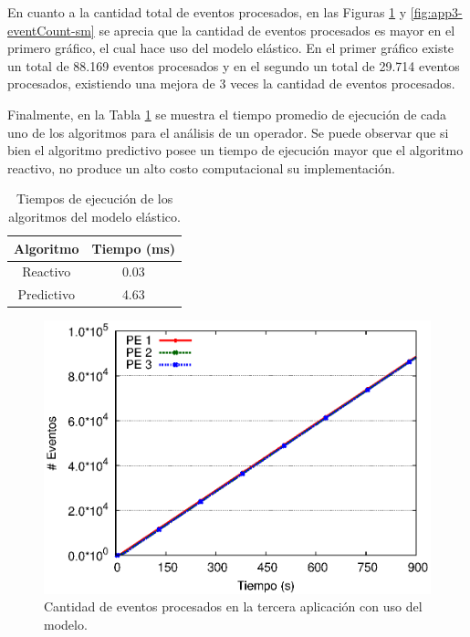En cuanto a la cantidad total de eventos procesados, en las Figuras \ref{fig:app3-eventCount-cm} y \ref{fig:app3-eventCount-sm} se aprecia que la cantidad de eventos procesados es mayor en el primero gr\'afico, el cual hace uso del modelo el\'astico. En el primer gr\'afico existe un total de 88.169 eventos procesados y en el segundo un total de 29.714 eventos procesados, existiendo una mejora de 3 veces la cantidad de eventos procesados.


Finalmente, en la Tabla \ref{tab:tiempo-algoritmos} se muestra el tiempo promedio de ejecuci\'on de cada uno de los algoritmos para el an\'alisis de un operador. Se puede observar que si bien el algoritmo predictivo posee un tiempo de ejecuci\'on mayor que el algoritmo reactivo, no produce un alto costo computacional su implementaci\'on.

\begin{table}[!ht]
\centering
\caption{Tiempos de ejecuci\'on de los algoritmos del modelo el\'astico.}
\begin{tabular}{| c | c |}
\hline
Algoritmo & Tiempo (ms) \\ \hline
Reactivo & 0.03 \\
Predictivo & 4.63 \\ \hline
\end{tabular}
\label{tab:tiempo-algoritmos}
\end{table}

\newpage

\begin{figure}[!ht]
\centering
    \includegraphics[scale=0.75]{images/exp/app3/cm/logical/eventCount.eps}
    \caption{Cantidad de eventos procesados en la tercera aplicaci\'on con uso del modelo.}
    \label{fig:app3-eventCount-cm}
\end{figure}

